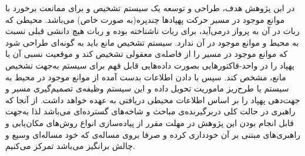 در این پژوهش هدف، طراحی و توسعه یک سیستم تشخیص و  برای ممانعت برخورد با موانع موجود در مسیر حرکت پهپادها چندپره(به صورت خاص) می‌باشد. محیطی که ربات در آن به پرواز درمی‌آید، برای ربات ناشناخته بوده و ربات هیچ دانشی قبلی نسبت به محیط و موانع موجود در آن ندارد. سیستم تشخیص مانع باید به گونه‌ای طراحی شود که موانع موجود در مسیر را از فاصله‌ی معقولی تشخیص کند و موقعیت نسبی آن با پهپاد را در واحد-فاکتورهایی بصورت داده‌هایی قابل فهم برای سیستم به‌جهت تشخیص مانع، مشخص کند. سپس با دادن اطلاعات بدست آمده از موانع موجود در محیط به سیستم  یا طرح‌ریز ماموریت تحویل داده و این سیستم وظیفه‌‌ی تصمیم‌گیری مسیر و جهت‌دهی پهپاد را بر اساس اطلاعات محیطی دریافتی به عهده خواهد داشت.
از آنجا که راهبری در حالت کلی دربرگیرنده‌ی مباحث و شاخه‌های گسترده‌ای می‌باشد لذا به‌جهت قابل انجام بودن این پژوهش در مهلت مقرر از پیاده‌سازی انواع روش‌های مکان‌یابی و راهبری‌های مبتنی بر آن خودداری کرده و صرفا بروی مساله‌ی  که خود مساله‌ای وسیع و چالش برانگیز می‌باشد تمرکز می‌کنیم.